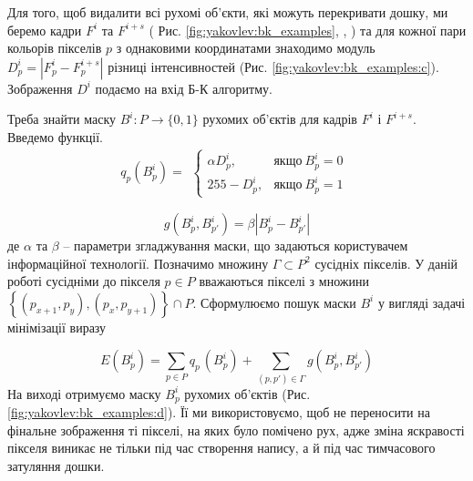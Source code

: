 Для того, щоб видалити всі рухомі об'єкти, які можуть перекривати дошку, ми
беремо кадри \(F^{i}\) та \(F^{i + s}\)  ( Рис. \ref{fig:yakovlev:bk_examples},
,
) та для
кожної пари кольорів пікселів \(p\) з однаковими координатами знаходимо
модуль \(D_{p}^{i} = \left| F_{p}^{i} - F_{p}^{i + s} \right|\) різниці
інтенсивностей (Рис. \ref{fig:yakovlev:bk_examples:c}). Зображення \(D^{i}\) подаємо на вхід
Б-К алгоритму.

Треба знайти маску $B^{i}:P \rightarrow \{0,1\}$ рухомих
об'єктів для кадрів \(F^{i}\) і \(F^{i + s}\).
Введемо функції.
\begin{equation*}
	q_{p}(B_{p}^{i}) =
	\begin{gathered}
		\begin{cases}
			\alpha D_{p}^{i}, & якщо\ B_{p}^{i} = 0 \\
			255 - D_{p}^{i},  & якщо\ B_{p}^{i} = 1 
		\end{cases}
	\end{gathered}
\end{equation*}

\begin{equation*}
	g(B_{p}^{i},B_{p'}^{i}) = \beta|B_{p}^{i} - B_{p'}^{i}|
\end{equation*}
де \(\alpha\) та \(\beta\) -- параметри згладжування маски, що задаються
користувачем інформаційної технології. Позначимо множину
$\Gamma \subset P^{2}$ сусідніх пікселів. У даній роботі сусідніми до
пікселя \(p \in P\) вважаються пікселі з множини
\(\left\{ \left( p_{x + 1},p_{y} \right),\left( p_{x},p_{y + 1} \right) \right\} \cap P\).
Сформулюємо пошук маски \(B^{i}\) у вигляді задачі мінімізації виразу

\begin{equation*}
	E\left( B_{p}^{i} \right) = \sum_{p \in P}^{}{q_{{p\ }}( B_{p}^{i}) +}\sum_{(p,p') \in \Gamma}^{}g(B_{p}^{i},B_{p'}^{i})
\end{equation*}
На виході отримуємо маску \(B_{p}^{i}\) рухомих об'єктів (Рис.
\ref{fig:yakovlev:bk_examples:d}).
Її ми використовуємо, щоб не переносити на фінальне зображення ті
пікселі, на яких було помічено рух, адже зміна яскравості пікселя
виникає не тільки під час створення напису, а й під час тимчасового
затуляння дошки.

